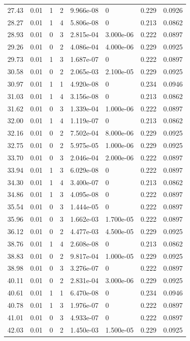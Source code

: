 \documentclass[preview]{standalone}
\begin{document}
{{{\begin{tabular}{L{1.2cm}C{1.2cm} C{0.3cm}C{0.5cm} C{1.4cm}C{1.4cm} C{1.4cm}C{1.4cm}}
  27.43  &  0.01  & 1     &  2 &  9.966e-08  & 0  & 0.229 &  0.0926   \\ 
  28.27  &  0.01  & 1     &  4 &  5.806e-08  & 0  & 0.213 &  0.0862   \\ 
  28.93  &  0.01  & 0     &  3 &  2.815e-04  & 3.000e-06  & 0.222 &  0.0897   \\ 
  29.26  &  0.01  & 0     &  2 &  4.086e-04  & 4.000e-06  & 0.229 &  0.0925   \\ 
  29.73  &  0.01  & 1     &  3 &  1.687e-07  & 0  & 0.222 &  0.0897   \\ 
  30.58  &  0.01  & 0     &  2 &  2.065e-03  & 2.100e-05  & 0.229 &  0.0925   \\ 
  30.97  &  0.01  & 1     &  1 &  4.920e-08  & 0  & 0.234 &  0.0946   \\ 
  31.03  &  0.01  & 1     &  4 &  3.156e-08  & 0  & 0.213 &  0.0862   \\ 
  31.62  &  0.01  & 0     &  3 &  1.339e-04  & 1.000e-06  & 0.222 &  0.0897   \\ 
  32.00  &  0.01  & 1     &  4 &  1.119e-07  & 0  & 0.213 &  0.0862   \\ 
  32.16  &  0.01  & 0     &  2 &  7.502e-04  & 8.000e-06  & 0.229 &  0.0925   \\ 
  32.75  &  0.01  & 0     &  2 &  5.975e-05  & 1.000e-06  & 0.229 &  0.0925   \\ 
  33.70  &  0.01  & 0     &  3 &  2.046e-04  & 2.000e-06  & 0.222 &  0.0897   \\ 
  33.94  &  0.01  & 1     &  3 &  6.029e-08  & 0  & 0.222 &  0.0897   \\ 
  34.30  &  0.01  & 1     &  4 &  3.400e-07  & 0  & 0.213 &  0.0862   \\ 
  34.86  &  0.01  & 1     &  3 &  4.095e-08  & 0  & 0.222 &  0.0897   \\ 
  35.54  &  0.01  & 0     &  3 &  1.444e-05  & 0  & 0.222 &  0.0897   \\ 
  35.96  &  0.01  & 0     &  3 &  1.662e-03  & 1.700e-05  & 0.222 &  0.0897   \\ 
  36.12  &  0.01  & 0     &  2 &  4.477e-03  & 4.500e-05  & 0.229 &  0.0925   \\ 
  38.76  &  0.01  & 1     &  4 &  2.608e-08  & 0  & 0.213 &  0.0862   \\ 
  38.83  &  0.01  & 0     &  2 &  9.817e-04  & 1.000e-05  & 0.229 &  0.0925   \\ 
  38.98  &  0.01  & 0     &  3 &  3.276e-07  & 0  & 0.222 &  0.0897   \\ 
  40.11  &  0.01  & 0     &  2 &  2.831e-04  & 3.000e-06  & 0.229 &  0.0925   \\ 
  40.61  &  0.01  & 1     &  1 &  6.470e-08  & 0  & 0.234 &  0.0946   \\ 
  40.78  &  0.01  & 1     &  3 &  1.976e-07  & 0  & 0.222 &  0.0897   \\ 
  41.01  &  0.01  & 0     &  3 &  4.933e-07  & 0  & 0.222 &  0.0897   \\ 
  42.03  &  0.01  & 0     &  2 &  1.450e-03  & 1.500e-05  & 0.229 &  0.0925   \\ 
\hline 
\end{tabular} 

}}}
\end{document}

